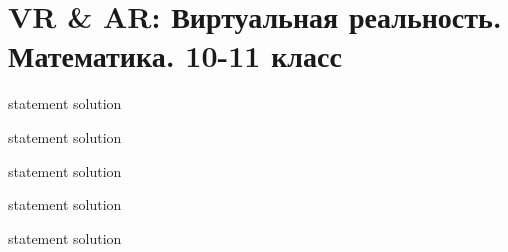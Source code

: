 \chapter{VR \& AR: Виртуальная реальность. Математика. 10-11 класс}

{statement}
{solution}

{statement}
{solution}

{statement}
{solution}

{statement}
{solution}

{statement}
{solution}